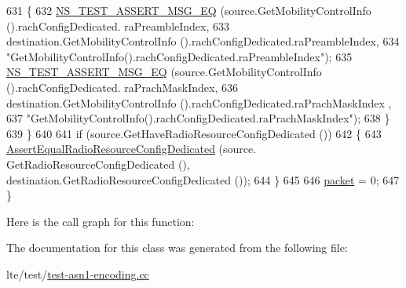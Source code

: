\begin{DoxyCode}
631         \{
632           \hyperlink{group__testing_ga2a9d78cffb3db8e867c35fff0b698cf5}{NS\_TEST\_ASSERT\_MSG\_EQ} (source.GetMobilityControlInfo ().rachConfigDedicated.
      raPreambleIndex,
633                                  destination.GetMobilityControlInfo ().rachConfigDedicated.raPreambleIndex,
634                                  \textcolor{stringliteral}{"GetMobilityControlInfo().rachConfigDedicated.raPreambleIndex"});
635           \hyperlink{group__testing_ga2a9d78cffb3db8e867c35fff0b698cf5}{NS\_TEST\_ASSERT\_MSG\_EQ} (source.GetMobilityControlInfo ().rachConfigDedicated.
      raPrachMaskIndex,
636                                  destination.GetMobilityControlInfo ().rachConfigDedicated.raPrachMaskIndex
      ,
637                                  \textcolor{stringliteral}{"GetMobilityControlInfo().rachConfigDedicated.raPrachMaskIndex"});
638         \}
639     \}
640 
641   \textcolor{keywordflow}{if} (source.GetHaveRadioResourceConfigDedicated ())
642     \{
643       \hyperlink{classRrcHeaderTestCase_ab6230c6987acd58d7482ca5e40b80875}{AssertEqualRadioResourceConfigDedicated} (source.
      GetRadioResourceConfigDedicated (), destination.GetRadioResourceConfigDedicated ());
644     \}
645 
646   \hyperlink{classRrcHeaderTestCase_a6f0748c0e845f797497fbda1ca781803}{packet} = 0;
647 \}
\end{DoxyCode}


Here is the call graph for this function\+:




The documentation for this class was generated from the following file\+:\begin{DoxyCompactItemize}
\item 
lte/test/\hyperlink{test-asn1-encoding_8cc}{test-\/asn1-\/encoding.\+cc}\end{DoxyCompactItemize}
